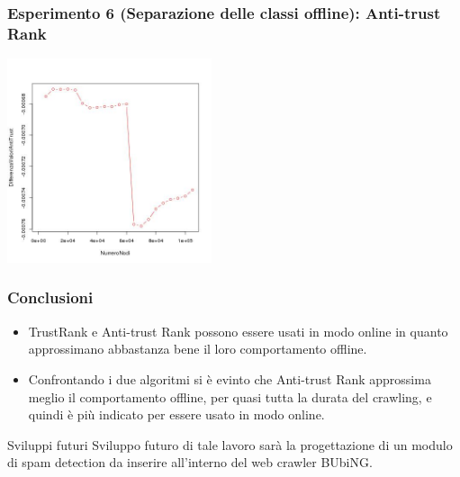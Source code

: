 \documentclass{beamer}
\begin{document}
\begin{frame}
\frametitle{Esperimento 6 {\tiny(Separazione delle classi offline)}: Anti-trust Rank}
\begin{center}
 \includegraphics[height=6cm]{immagini/test6/averageCompleteTest_antitrust_62}
\end{center}
\end{frame}
\begin{frame}
 \frametitle{Conclusioni}
 \begin{itemize}
  \item TrustRank e Anti-trust Rank possono essere usati in modo online in quanto approssimano abbastanza bene il loro comportamento offline.
  \item Confrontando i due algoritmi si è evinto che Anti-trust Rank approssima meglio il comportamento offline, per quasi tutta la durata del crawling, e quindi è più indicato per essere usato in modo online.
   \end{itemize}
  \begin{block}{Sviluppi futuri}
    Sviluppo futuro di tale lavoro sarà la progettazione di un modulo di spam detection da inserire all’interno del web crawler BUbiNG.
  \end{block}
\end{frame}
\end{document}

